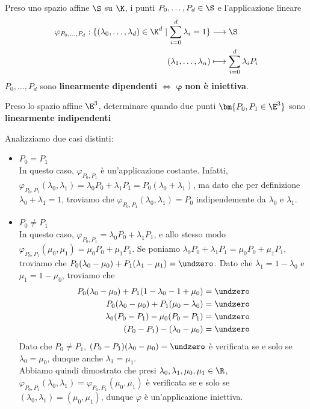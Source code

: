 \documentclass[11pt, a4paper, titlepage, oneside]{scrbook}
\begin{document}
\begin{Definizione}
\label{def-dipendenza-lineare-tra-punti}
Preso uno spazio affine $\S$ su $\K$, i punti $P_0, \ldots, P_d \in \S$ e l'applicazione lineare
\begin{align*}
\varphi_{P_0, \ldots, P_d}: \{(\lambda_0, \ldots, \lambda_d) \in \K^d \mid \sum_{i = 0}^d \lambda_i = 1\} &\longrightarrow \S  \\
(\lambda_1, \ldots, \lambda_n) &\longmapsto \sum_{i = 0}^d \lambda_i P_i 
\end{align*}
$P_0, \ldots, P_d$ sono \textbf{linearmente dipendenti} $\iff$ $\bm{\varphi}$ \textbf{non è iniettiva}.
\end{Definizione}

\Esempi \nopagebreak

Preso lo spazio affine $\E^3$, determinare quando due punti $\bm{P_0,P_1 \in  \E^3}$ sono \textbf{linearmente indipendenti} \nopagebreak

Analizziamo due casi distinti:
\begin{itemize}
    \item $P_0 = P_1$ \\
    In questo caso, $\varphi_{P_0,P_1}$ è un'applicazione costante. Infatti, $\varphi_{P_0,P_1}(\lambda_0,\lambda_1) = \lambda_0 P_0 + \lambda_1 P_1 = P_0(\lambda_0 + \lambda_1)$, ma dato che per definizione $\lambda_0 + \lambda_1 = 1$, troviamo che $\varphi_{P_0,P_1}(\lambda_0,\lambda_1) = P_0$ indipendemente da $\lambda_0$ e $\lambda_1$.
    \item $P_0 \neq P_1$ \\
    In questo caso, $\varphi_{P_0,P_1} = \lambda_0 P_0 + \lambda_1 P_1$, e allo stesso modo \mbox{$\varphi_{P_0,P_1}(\mu_0,\mu_1) = \mu_0 P_0 + \mu_1 P_1$}. Se poniamo $\lambda_0 P_0 + \lambda_1 P_1 = \mu_0 P_0 + \mu_1 P_1$, troviamo che $P_0(\lambda_0 - \mu_0) + P_1(\lambda_1 - \mu_1) = \undzero$. Dato che \mbox{$\lambda_1 = 1 - \lambda_0$} e $\mu_1 = 1 - \mu_0$, troviamo che 
    \begin{align*}
    P_0(\lambda_0 - \mu_0) + P_1(1-\lambda_0 - 1 + \mu_0) &= \undzero  \\
    P_0(\lambda_0 - \mu_0) + P_1(\mu_0 - \lambda_0) &= \undzero \\
    \lambda_0(P_0 - P_1) - \mu_0(P_0 - P_1) &= \undzero \\
    (P_0 - P_1) - (\lambda_0 - \mu_0) &= \undzero
    \end{align*}
    Dato che $P_0 \neq P_1$, $(P_0 - P_1)(\lambda_0 - \mu_0) = \undzero$ è verificata se e solo se $\lambda_0 = \mu_0$, dunque anche $\lambda_1 = \mu_1$. \\
    Abbiamo quindi dimostrato che presi $\lambda_0,\lambda_1, \mu_0,\mu_1 \in \R$, $\varphi_{P_0,P_1} (\lambda_0, \lambda_1) = \varphi_{P_0,P_1}(\mu_0,\mu_1)$ è verificata se e solo se $(\lambda_0,\lambda_1) = (\mu_0,\mu_1)$, dunque $\varphi$ è un'applicazione iniettiva. 
\end{itemize}
\end{document}
